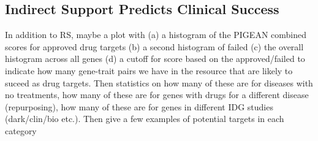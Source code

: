 \subsection{Indirect Support Predicts Clinical Success}

In addition to RS, maybe a plot with (a) a histogram of the PIGEAN combined scores for approved drug targets (b) a second histogram of failed (c) the overall histogram across all genes (d) a cutoff for score based on the approved/failed to indicate how many gene-trait pairs we have in the resource that are likely to suceed as drug targets. Then statistics on how many of these are for diseases with no treatments, how many of these are for genes with drugs for a different disease (repurposing), how many of these are for genes in different IDG studies (dark/clin/bio etc.). Then give a few examples of potential targets in each category

